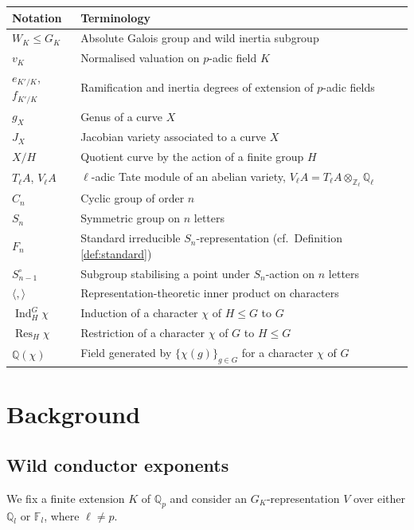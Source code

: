 \documentclass[12pt]{amsart}
\theoremstyle{definition}
\theoremstyle{remark}
\newcommand{\QQ}{\mathbb{Q}}
\newcommand{\ZZ}{\mathbb{Z}}
\newcommand{\FF}{\mathbb{F}}
\DeclareMathOperator{\Res}{Res}
\DeclareMathOperator{\Ind}{Ind}
\begin{document}
\vspace{0.2cm}

\renewcommand{\arraystretch}{1.5}
\begin{longtable}{p{}  p{}} 
        Notation & Terminology \\
        \hline
        $W_K\le G_K$ & Absolute Galois group and wild inertia subgroup \\
        $v_K$ & Normalised valuation on $p$-adic field $K$ \\
        $e_{K'/K}$, $f_{K'/K}$ & Ramification and inertia degrees of extension of $p$-adic fields \\
        $g_X$ & Genus of a curve $X$ \\
        $J_X$ & Jacobian variety associated to a curve $X$ \\
        $X/H$ & Quotient curve by the action of a finite group $H$ \\
        $T_\ell A$, $V_\ell A$ & $\ell$-adic Tate module of an abelian variety, $V_\ell A=T_\ell A\otimes_{\ZZ_\ell}\QQ_\ell$ \\
        $C_n$ & Cyclic group of order $n$ \\
        $S_n$ & Symmetric group on $n$ letters \\
        $F_n$ & Standard irreducible $S_n$-representation (cf.\ Definition \ref{def:standard}) \\
        $S_{n-1}^\circ$ & Subgroup stabilising a point under $S_n$-action on $n$ letters \\
        $\langle,\rangle$ & Representation-theoretic inner product on characters \\
        $\Ind_H^G \chi$ & Induction of a character $\chi$ of $H\le G$ to $G$ \\
        $\Res_H \chi$ & Restriction of a character $\chi$ of $G$ to $H\le G$ \\
        $\QQ(\chi)$ & Field generated by $\{\chi(g)\}_{g\in G}$ for a character $\chi$ of $G$
\end{longtable}

\section{Background}

\subsection{Wild conductor exponents}\label{sec:conductors}
We fix a finite extension $K$ of $\QQ_p$ and consider an $G_K$-representation $V$ over either $\QQ_l$ or $\FF_l$, where $\ell\ne p$.
\end{document}
